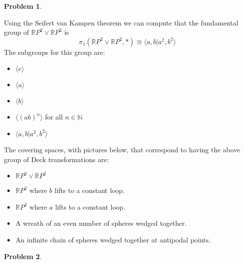 \documentclass[10pt]{article}
\newcommand{\sk}{\vskip 10mm}
\newcommand{\bb}[1]{\mathbb{#1}}
\theoremstyle{plain}
\newtheorem{problem}{Problem}
\theoremstyle{remark}
\begin{document}
\sk

\begin{problem} %
  
\end{problem}

Using the Seifert van Kampen theorem we can compute that the
fundamental group of $\bb{R}P^2\vee \bb{R}P^2$ is
\[ \pi_1(\bb{R}P^2\vee \bb{R}P^2,*)\cong \langle a,b|a^2,b^2\rangle\]
The subgroups for this group are:
\begin{itemize}
\item $\langle e\rangle$
\item $\langle a\rangle$
\item $\langle b\rangle$
\item $\langle (ab)^n\rangle$ for all $n\in \bb{N}$
\item $\langle a,b|a^2,b^2\rangle$
\end{itemize}

The covering spaces, with pictures below, that correspond to having
the above group of Deck transformations are:

\begin{itemize}
\item $\bb{R}P^2\vee \bb{R}P^2$
\item $\bb{R}P^2$ where $b$ lifts to a constant loop.
\item $\bb{R}P^2$ where $a$ lifts to a constant loop.
\item A wreath of an even number of spheres wedged together.
\item An infinite chain of spheres wedged together at antipodal points.
\end{itemize}


\sk

\begin{problem} %
  
\end{problem}
\end{document}
